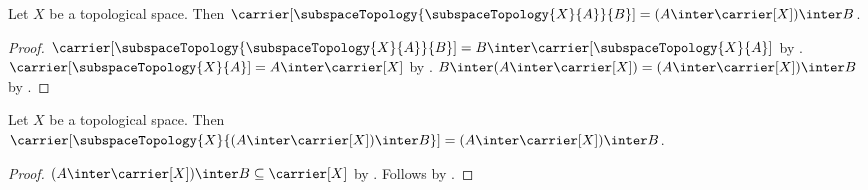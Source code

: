 \begin{proposition}\label{iterated_subspace_carrier}
    Let $X$ be a topological space.
    Then
        $\carrier[\subspaceTopology{\subspaceTopology{X}{A}}{B}]
            =(A\inter\carrier[X])\inter B$.
\end{proposition}
\begin{proof}
    $\carrier[\subspaceTopology{\subspaceTopology{X}{A}}{B}]
        =B\inter\carrier[\subspaceTopology{X}{A}]$ by
        .
    $\carrier[\subspaceTopology{X}{A}]=A\inter\carrier[X]$ by
        .
    $B\inter(A\inter\carrier[X])
        =(A\inter\carrier[X])\inter B$ by .
\end{proof}

\begin{proposition}\label{transitive_subspace_carrier}
    Let $X$ be a topological space.
    Then
        $\carrier[\subspaceTopology{X}{(A\inter\carrier[X])\inter B}]
            =(A\inter\carrier[X])\inter B$.
\end{proposition}
\begin{proof}
    $(A\inter\carrier[X])\inter B\subseteq\carrier[X]$ by
        .
    Follows by .
\end{proof}

